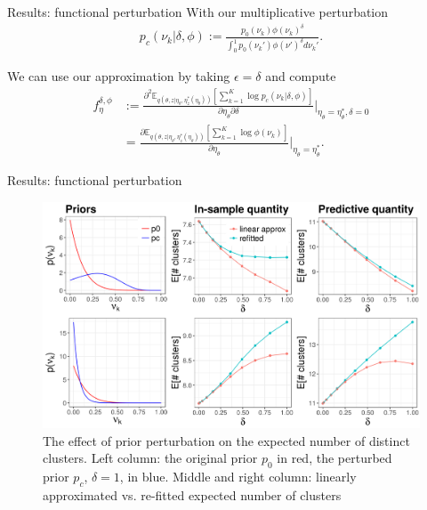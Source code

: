 \documentclass[10pt]{beamer}\usepackage[]{graphicx}\usepackage[]{color}
\newenvironment{knitrout}{}{} %
\newcommand{\Expect}{\mathbb{E}}
\newcommand{\etazopt}{\eta_z^{*}}
\newcommand{\etathetaopt}{\eta_\theta^{*}}
\newcommand{\QExpect}
{\Expect_{q\left(\theta, z \vert \eta_\theta, \etazopt(\eta_\theta)\right)}}
\begin{document}
\begin{frame}{Results: functional perturbation}
With our multiplicative perturbation
%
\begin{align*}
	p_c(\nu_k \vert \delta, \phi) :=
  \frac{p_{0}(\nu_k)\phi(\nu_k)^\delta}
       {\int_0^1 p_0(\nu_k')\phi(\nu')^\delta d\nu_k'}.
\end{align*}

We can use our approximation by taking
$\epsilon = \delta$ and compute 
%
\begin{align*}
f^{\delta,\phi}_\eta &:=
\frac{\partial^2
    \QExpect \left[ \sum_{k=1}^K \log p_c(\nu_k \vert \delta, \phi) \right]}
{\partial \eta_\theta \partial \delta}
    \Big\rvert_{\eta_\theta = \etathetaopt, \delta = 0} \\
    &=
\frac{\partial
    \QExpect \left[ \sum_{k=1}^K  \log\phi(\nu_k) \right]}
{\partial \eta_\theta}
    \Big\rvert_{\eta_\theta = \etathetaopt}.
\end{align*}

\end{frame}


\begin{frame}{Results: functional perturbation}
\begin{figure}
\centering

\begin{knitrout}
\color{fgcolor}

{\centering \includegraphics[width=0.98\linewidth,height=0.588\linewidth]{figure/functional_sens_plot_thresh0-1} 

}



\end{knitrout}
\caption{The effect of prior perturbation on the expected number of distinct clusters. Left column: the original prior $p_0$ in red, the perturbed prior $p_c$, $\delta = 1$, in blue. Middle and right column: linearly approximated vs.
re-fitted expected number of clusters}
\end{figure}

\end{frame}
\end{document}
